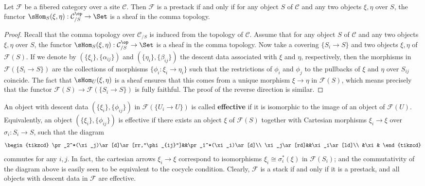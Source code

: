 \begin{proposition}\label{descent fibre cat stack iff sheaf Hom}
Let $\mathcal{F}$ be a fibered category over a site $\mathcal{C}$. Then $\mathcal{F}$ is a prestack if and only if for any object $S$ of $\mathcal{C}$ and any two objects $\xi,\eta$ over $S$, the functor $\sHom_S(\xi,\eta):\mathcal{C}_{/S}^{\op}\to\Set$ is a sheaf in the comma topology.
\end{proposition}
\begin{proof}
Recall that the comma topology over $\mathcal{C}_{/S}$ is induced from the topology of $\mathcal{C}$. Assume that for any object $S$ of $\mathcal{C}$ and any two objects $\xi,\eta$ over $S$, the functor $\sHom_S(\xi,\eta):\mathcal{C}_{/S}^{\op}\to\Set$ is a sheaf in the comma topology. Now take a covering $\{S_i\to S\}$ and two objects $\xi,\eta$ of $\mathcal{F}(S)$. If we denote by $(\{\xi_i\},\{\alpha_{ij}\})$ and $(\{\eta_i\},\{\beta_{ij}\})$ the descent data associated with $\xi$ and $\eta$, respectively, then the morphisms in $\mathcal{F}(\{S_i\to S\})$ are the collections of morphisms $\{\phi_i:\xi_i\to\eta_i\}$ such that the restrictions of $\phi_i$ and $\phi_j$ to the pullbacks of $\xi$ and $\eta$ over $S_{ij}$ coincide. The fact that $\sHom_U(\xi,\eta)$ is a sheaf ensures that this comes from a unique morphism $\xi\to\eta$ in $\mathcal{F}(S)$, which means precisely that the functor $\mathcal{F}(S)\to\mathcal{F}(\{S_i\to S\})$ is fully faithful. The proof of the reverse direction is similar.
\end{proof}

An object with descent data $(\{\xi_i\},\{\phi_{ij}\})$ in $\mathcal{F}(\{U_i\to U\})$ is called \textbf{effective} if it is isomorphic to the image of an object of $\mathcal{F}(U)$. Equivalently, an object $(\{\xi_i\},\{\phi_{ij}\})$ is effective if there exists an object $\xi$ of $\mathcal{F}(S)$ together with Cartesian morphisms $\xi_i\to\xi$ over $\sigma_i:S_i\to S$, such that the diagram
\[\begin{tikzcd}
\pr_2^*(\xi_j)\ar[d]\ar[rr,"\phi_{ij}"]&&\pr_1^*(\xi_i)\ar[d]\\
\xi_j\ar[rd]&&\xi_i\ar[ld]\\
&\xi&
\end{tikzcd}\]
commutes for any $i,j$. In fact, the cartesian arrows $\xi_i\to\xi$ correspond to isomorphisms $\xi_i\cong\sigma_i^*(\xi)$ in $\mathcal{F}(S_i)$; and the commutativity of the diagram above is easily seen to be equivalent to the cocycle condition. Clearly, $\mathcal{F}$ is a stack if and only if it is a prestack, and all objects with descent data in $\mathcal{F}$ are effective. 

